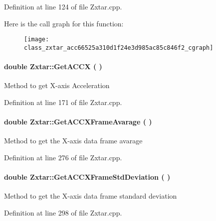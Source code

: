 \begin{appendices}
\-Definition at line 124 of file \-Zxtar.\-cpp.



\-Here is the call graph for this function\-:\nopagebreak
\begin{figure}[H]
\begin{center}
\leavevmode
\texttt{[image: class\_zxtar\_acc66525a310d1f24e3d985ac85c846f2\_cgraph]}
\end{center}
\end{figure}


\paragraph[{\-Get\-A\-C\-C\-X}]{\setlength{\rightskip}{0pt plus 5cm}double {\bf \-Zxtar\-::\-Get\-A\-C\-C\-X} (
)}\label{class_zxtar_a2d281a6f0b4af1415534315c49310fa2}
\-Method to get \-X-\/axis \-Acceleration 

\-Definition at line 171 of file \-Zxtar.\-cpp.

\paragraph[{\-Get\-A\-C\-C\-X\-Frame\-Avarage}]{\setlength{\rightskip}{0pt plus 5cm}double {\bf \-Zxtar\-::\-Get\-A\-C\-C\-X\-Frame\-Avarage} (
)}\label{class_zxtar_a05401473e403950d0ae3f3bd111b0a5e}
\-Method to get the \-X-\/axis data frame avarage 

\-Definition at line 276 of file \-Zxtar.\-cpp.

\paragraph[{\-Get\-A\-C\-C\-X\-Frame\-Std\-Deviation}]{\setlength{\rightskip}{0pt plus 5cm}double {\bf \-Zxtar\-::\-Get\-A\-C\-C\-X\-Frame\-Std\-Deviation} (
)}\label{class_zxtar_a1df7370b9b0a58d1554248b56fdc90e6}
\-Method to get the \-X-\/axis data frame standard deviation 

\-Definition at line 298 of file \-Zxtar.\-cpp.


\end{appendices}
